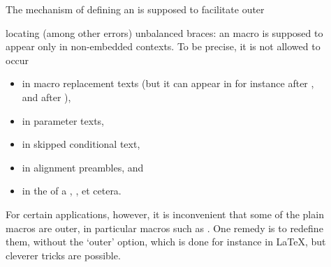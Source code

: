 \documentclass[letterpaper]{book}
\begin{document}
\begin{description}
\item []
The mechanism of defining an  is supposed to facilitate
\cstoidx outer\par
locating (among other errors) unbalanced braces: an 
macro is supposed
to  appear only in non-embedded contexts.
To be precise, it is not allowed to occur 
\begin{itemize}
\item in macro replacement texts (but it can appear in
    for instance  after 
    , and after ),
\item in parameter texts,
\item in skipped conditional text,
\item in alignment preambles, and
\item in the  of a , ,
et cetera. \end{itemize}
For certain applications, however, it is inconvenient
that some of the plain macros  are outer, 
in particular macros such as . One remedy is to
redefine them, without the `outer' option, which
is done for instance in \LaTeX, but  cleverer tricks are possible.



\end{description}
\end{document}
